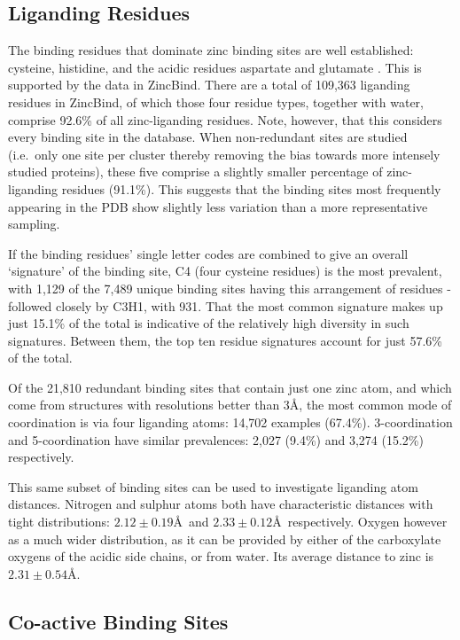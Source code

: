 \subsection{Liganding Residues}

The binding residues that dominate zinc binding sites are well established: cysteine, histidine, and the acidic residues aspartate and glutamate . This is supported by the data in ZincBind. There are a total of 109,363 liganding residues in ZincBind, of which those four residue types, together with water, comprise 92.6\% of all zinc-liganding residues. Note, however, that this considers every binding site in the database. When non-redundant sites are studied (i.e.\ only one site per cluster thereby removing the bias towards more intensely studied proteins), these five comprise a slightly smaller percentage of zinc-liganding residues (91.1\%). This suggests that the binding sites most frequently appearing in the PDB show slightly less variation than a more representative sampling.

If the binding residues' single letter codes are combined to give an overall `signature' of the binding site, C4 (four cysteine residues) is the most prevalent, with 1,129 of the 7,489 unique binding sites having this arrangement of residues - followed closely by C3H1, with 931. That the most common signature makes up just 15.1\% of the total is indicative of the relatively high diversity in such signatures. Between them, the top ten residue signatures account for just 57.6\% of the total.

Of the 21,810 redundant binding sites that contain just one zinc atom, and which come from structures with resolutions better than 3\AA, the most common mode of coordination is via four liganding atoms: 14,702 examples (67.4\%). 3-coordination and 5-coordination have similar prevalences: 2,027 (9.4\%) and 3,274 (15.2\%) respectively. 

This same subset of binding sites can be used to investigate liganding atom distances. Nitrogen and sulphur atoms both have characteristic distances with tight distributions: $2.12\pm0.19$\AA\ and $2.33\pm0.12$\AA\ respectively. Oxygen however as a much wider distribution, as it can be provided by either of the carboxylate oxygens of the acidic side chains, or from water. Its average distance to zinc is $2.31\pm0.54$\AA.

\subsection{Co-active Binding Sites}

